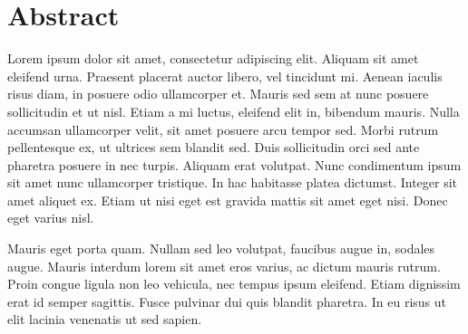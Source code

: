 \section*{Abstract}

Lorem ipsum dolor sit amet, consectetur adipiscing elit. Aliquam sit amet eleifend urna. Praesent placerat auctor libero, vel tincidunt mi. Aenean iaculis risus diam, in posuere odio ullamcorper et. Mauris sed sem at nunc posuere sollicitudin et ut nisl. Etiam a mi luctus, eleifend elit in, bibendum mauris. Nulla accumsan ullamcorper velit, sit amet posuere arcu tempor sed. Morbi rutrum pellentesque ex, ut ultrices sem blandit sed. Duis sollicitudin orci sed ante pharetra posuere in nec turpis. Aliquam erat volutpat. Nunc condimentum ipsum sit amet nunc ullamcorper tristique. In hac habitasse platea dictumst. Integer sit amet aliquet ex. Etiam ut nisi eget est gravida mattis sit amet eget nisi. Donec eget varius nisl.

Mauris eget porta quam. Nullam sed leo volutpat, faucibus augue in, sodales augue. Mauris interdum lorem sit amet eros varius, ac dictum mauris rutrum. Proin congue ligula non leo vehicula, nec tempus ipsum eleifend. Etiam dignissim erat id semper sagittis. Fusce pulvinar dui quis blandit pharetra. In eu risus ut elit lacinia venenatis ut sed sapien. 
